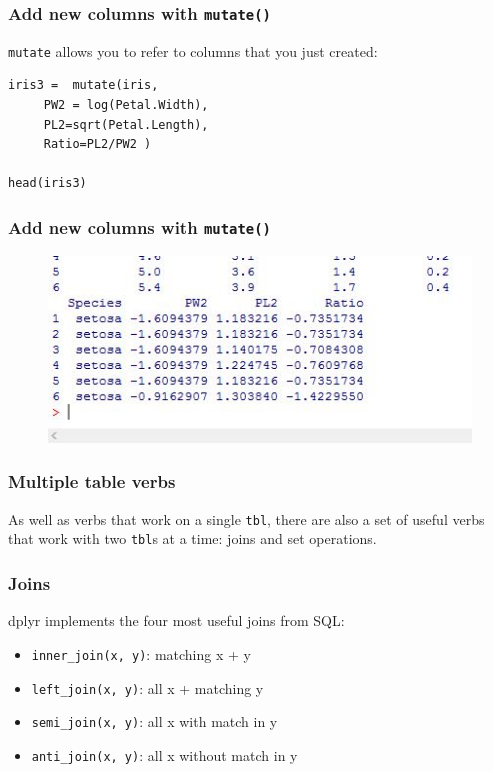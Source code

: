\documentclass{beamer}
\begin{document}
\begin{frame}[fragile]
	
	\frametitle{Add new columns with \texttt{mutate()} }
\texttt{mutate} allows you to refer to columns that you just created:

\begin{verbatim}
iris3 =  mutate(iris, 
     PW2 = log(Petal.Width), 
     PL2=sqrt(Petal.Length), 
     Ratio=PL2/PW2 )
     
head(iris3)
\end{verbatim}
\end{frame} 
\begin{frame}

\frametitle{Add new columns with \texttt{mutate()} }
	\begin{figure}
		\centering
		\includegraphics[width=0.9\linewidth]{irismutate2}
		
	\end{figure}
	
\end{frame}


\begin{frame}
	\frametitle{Multiple table verbs}

As well as verbs that work on a single \texttt{tbl}, there are also a set of useful verbs that work with two \texttt{tbl}s at a time: joins and set operations.
\end{frame}
\begin{frame}
	\frametitle{Joins}
dplyr implements the four most useful joins from SQL:

\begin{itemize}
	\item \texttt{inner\_join(x, y)}: matching x + y
	\item \texttt{left\_join(x, y)}: all x + matching y
	\item \texttt{semi\_join(x, y)}: all x with match in y
	\item \texttt{anti\_join(x, y)}: all x without match in y
\end{itemize}
\end{frame}
\end{document}
